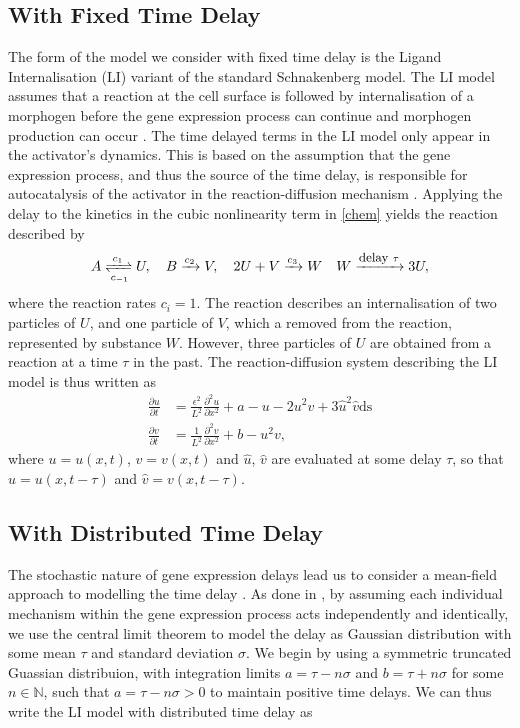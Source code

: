 \subsection{With Fixed Time Delay}

The form of the model we consider with fixed time delay is the Ligand Internalisation (LI) variant of the standard Schnakenberg model. The LI model assumes that a reaction at the cell surface is followed by internalisation of a morphogen before the gene expression process can continue and morphogen production can occur \cite{leegaffney,yigaffneyli}. The time delayed terms in the LI model only appear in the activator's dynamics. This is based on the assumption that the gene expression process, and thus the source of the time delay, is responsible for autocatalysis of the activator in the reaction-diffusion mechanism \cite{gaffmonk}. Applying the delay to the kinetics in the cubic nonlinearity term in \eqref{chem} yields the reaction described by \cite{baker}
\begin{equation}\label{chem}
A\xrightleftharpoons[c_{-1}]{c_1} U,\quad B\xrightarrow{c_2} V,\quad 2U+V\xrightarrow{c_3} W\quad W\xrightarrow{\text{\footnotesize delay } \tau}3U,
\end{equation}
where the reaction rates $c_i=1$. The reaction describes an internalisation of two particles of $U$, and one particle of $V$, which a removed from the reaction, represented by substance $W$. However, three particles of $U$ are obtained from a reaction at a time $\tau$ in the past. The reaction-diffusion system describing the LI model is thus written as \cite{leegaffney}
\begin{equation}\label{fixed}
  \begin{split}
  \frac{\partial u}{\partial t}&=\frac{\epsilon^2}{L^2}\frac{\partial^2u}{\partial x^2}+a-u-2u^2v+3\hat{u}^2\hat{v} \text{ds}\\
  \frac{\partial v}{\partial t}&=\frac{1}{L^2}\frac{\partial^2v}{\partial x^2}+b-u^2v,
\end{split}
\end{equation}
where $u=u(x,t)$, $v=v(x,t)$ and $\hat{u}$, $\hat{v}$ are evaluated at some delay $\tau$, so that $\hat{u}=u(x,t-\tau)$ and $\hat{v}=v(x,t-\tau)$.

\subsection{With Distributed Time Delay}

The stochastic nature of gene expression delays lead us to consider a mean-field approach to modelling the time delay \cite{bratsun,krausenew}. As done in \cite{william}, by assuming each individual mechanism within the gene expression process acts independently and identically, we use the central limit theorem to model the delay as Gaussian distribution with some mean $\tau$ and standard deviation $\sigma$. We begin by using a symmetric truncated Guassian distribuion, with integration limits $a=\tau-n\sigma$ and $b=\tau+n\sigma$ for some $n\in\mathbb{N}$, such that $a=\tau-n\sigma>0$ to maintain positive time delays. We can thus write the LI model with distributed time delay as

